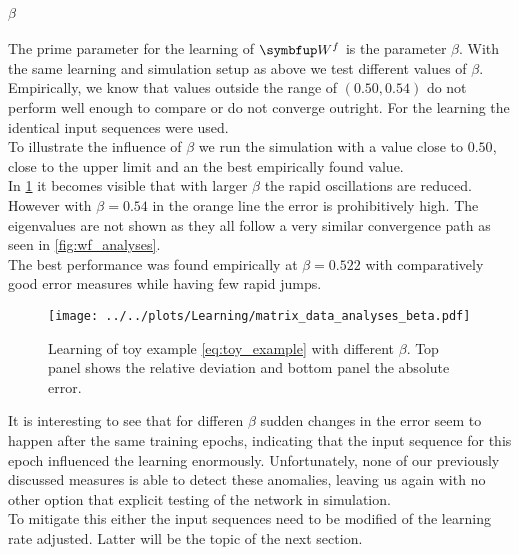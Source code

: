 \paragraph{$\beta$}
The prime parameter for the learning of $\bmu{W}^f$ is the parameter $\beta$. With the same learning and simulation setup as above we test different values of $\beta$. Empirically, we know that values outside the range of $(0.50,0.54)$ do not perform well enough to compare or do not converge outright. For the learning the identical input sequences were used.\\
To illustrate the influence of $\beta$ we run the simulation with a value close to $0.50$, close to the upper limit and an the best empirically found value.\\
In \cref{fig:beta_study} it becomes visible that with larger $\beta$ the rapid oscillations are reduced. However with $\beta = 0.54$ in the orange line the error is prohibitively high. The eigenvalues are not shown as they all follow a very similar convergence path as seen in \cref{fig:wf_analyses}.\\
The best performance was found empirically at $\beta = 0.522$ with comparatively good error measures while having few rapid jumps.\\
\begin{figure}
	\centering
	\texttt{[image: ../../plots/Learning/matrix\_data\_analyses\_beta.pdf]}
	\caption{Learning of toy example \cref{eq:toy_example} with different $\beta$. Top panel shows the relative deviation and bottom panel the absolute error.}
	\label{fig:beta_study}
\end{figure}

It is interesting to see that for differen $\beta$ sudden changes in the error seem to happen after the same training epochs, indicating that the input sequence for this epoch influenced the learning enormously.
Unfortunately, none of our previously discussed measures is able to detect these anomalies, leaving us again with no other option that explicit testing of the network in simulation.\\
To mitigate this either the input sequences need to be modified of the learning rate adjusted. Latter will be the topic of the next section.\\


